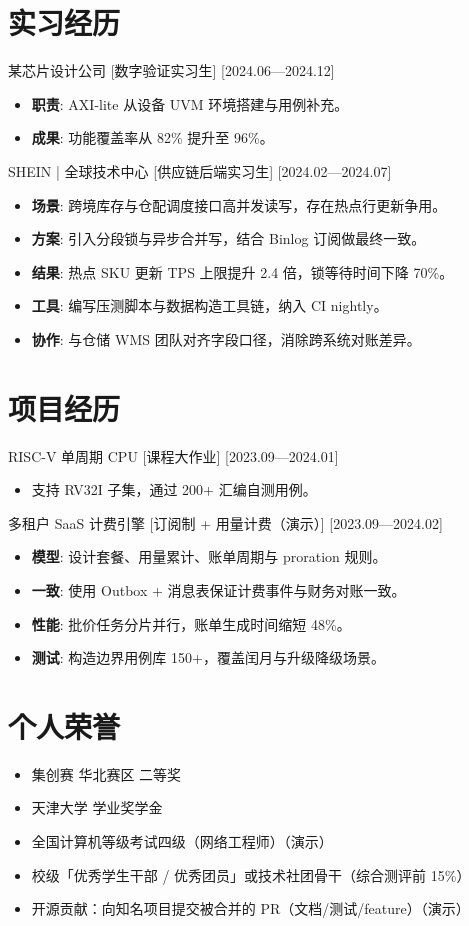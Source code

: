 \documentclass{resume-photo}
\begin{document}
\section{实习经历}
\ResumeItem
{某芯片设计公司}
[\textnormal{数字验证实习生}]
[2024.06—2024.12]

\begin{itemize}
  \item \textbf{职责}: AXI-lite 从设备 UVM 环境搭建与用例补充。
  \item \textbf{成果}: 功能覆盖率从 82\% 提升至 96\%。
\end{itemize}


\ResumeItem
{SHEIN | 全球技术中心}
[\textnormal{供应链后端实习生}]
[2024.02—2024.07]

\begin{itemize}
  \item \textbf{场景}: 跨境库存与仓配调度接口高并发读写，存在热点行更新争用。
  \item \textbf{方案}: 引入分段锁与异步合并写，结合 Binlog 订阅做最终一致。
  \item \textbf{结果}: 热点 SKU 更新 TPS 上限提升 2.4 倍，锁等待时间下降 70\%。
  \item \textbf{工具}: 编写压测脚本与数据构造工具链，纳入 CI nightly。
  \item \textbf{协作}: 与仓储 WMS 团队对齐字段口径，消除跨系统对账差异。
\end{itemize}



\section{项目经历}
\ResumeItem
{RISC-V 单周期 CPU}
[\textnormal{课程大作业}]
[2023.09—2024.01]

\begin{itemize}
  \item 支持 RV32I 子集，通过 200+ 汇编自测用例。
\end{itemize}


\ResumeItem
{多租户 SaaS 计费引擎}
[\textnormal{订阅制 + 用量计费（演示）}]
[2023.09—2024.02]

\begin{itemize}
  \item \textbf{模型}: 设计套餐、用量累计、账单周期与 proration 规则。
  \item \textbf{一致}: 使用 Outbox + 消息表保证计费事件与财务对账一致。
  \item \textbf{性能}: 批价任务分片并行，账单生成时间缩短 48\%。
  \item \textbf{测试}: 构造边界用例库 150+，覆盖闰月与升级降级场景。
\end{itemize}



\section{个人荣誉}
\begin{itemize}
  \item 集创赛 华北赛区 二等奖
  \item 天津大学 学业奖学金
  \item 全国计算机等级考试四级（网络工程师）（演示）
  \item 校级「优秀学生干部 / 优秀团员」或技术社团骨干（综合测评前 15\%）
  \item 开源贡献：向知名项目提交被合并的 PR（文档/测试/feature）（演示）
\end{itemize}
\end{document}
